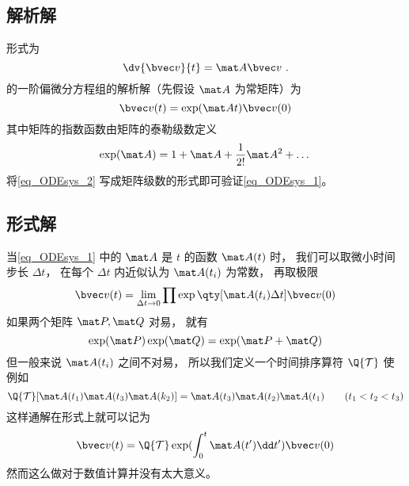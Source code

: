 

\subsection{解析解}
形式为
\begin{equation}\label{eq_ODEsys_1}
\dv{\bvec v}{t} = \mat A \bvec v~.
\end{equation}
的一阶偏微分方程组的解析解（先假设 $\mat A$ 为常矩阵）为
\begin{equation}\label{eq_ODEsys_2}
\bvec v(t) = \exp(\mat At) \bvec v(0)
\end{equation}
其中矩阵的指数函数由矩阵的泰勒级数定义
\begin{equation}\label{eq_ODEsys_4}
\exp(\mat A) = 1 + \mat A + \frac1{2!} \mat A^2 + \dots
\end{equation}
将\autoref{eq_ODEsys_2} 写成矩阵级数的形式即可验证\autoref{eq_ODEsys_1}。

\subsection{形式解}
当\autoref{eq_ODEsys_1} 中的 $\mat A$ 是 $t$ 的函数 $\mat A(t)$ 时， 我们可以取微小时间步长 $\Delta t$， 在每个 $\Delta t$ 内近似认为 $\mat A(t_i)$ 为常数， 再取极限
\begin{equation}
\bvec v(t) = \lim_{\Delta t \to 0} \prod \exp\qty[\mat A(t_i)\Delta t] \bvec v(0)
\end{equation}
如果两个矩阵 $\mat P, \mat Q$ 对易， 就有
\begin{equation}
\exp(\mat P)\exp(\mat Q) = \exp(\mat P + \mat Q)
\end{equation}
但一般来说 $\mat A(t_i)$ 之间不对易， 所以我们定义一个时间排序算符 $\Q{\mathcal T}$ 使例如
\begin{equation}
\Q {\mathcal T} [\mat A(t_1) \mat A(t_3) \mat A(k_2)] = \mat A(t_3) \mat A(t_2) \mat A(t_1) \qquad ( t_1 < t_2 < t_3 )
\end{equation}
这样通解在形式上就可以记为
\begin{equation}\label{eq_ODEsys_3}
\bvec v(t) = \Q {\mathcal T} \exp(\int_0^ t \mat A(t')\dd t') \bvec v(0)
\end{equation}
然而这么做对于数值计算并没有太大意义。

